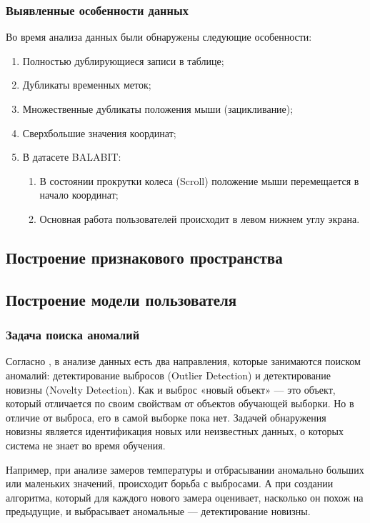 \documentclass[12pt]{article}
\begin{document}
    \subsubsection{Выявленные особенности данных}
    \label{sec:Research:Data:Features}
    
    Во время анализа данных были обнаружены следующие особенности:
    \begin{enumerate}
        \item Полностью дублирующиеся записи в таблице;
        \item Дубликаты временных меток;
        \item Множественные дубликаты положения мыши (зацикливание);
        \item Сверхбольшие значения координат;
        \item В датасете BALABIT:
        \begin{enumerate}
            \item В состоянии прокрутки колеса (Scroll) положение мыши перемещается в начало координат;
            \item Основная работа пользователей происходит в левом нижнем углу экрана.
        \end{enumerate}
    \end{enumerate}

    
    \subsection{Построение признакового пространства}
    \label{sec:Research:FeatureSpace}


    \subsection{Построение модели пользователя}
    \label{sec:Research:Model}
    
    \subsubsection{Задача поиска аномалий}
    \label{sec:Research:Model:Anomaly}

    \par Согласно \cite{Dyakonov, NoveltyDetection}, в анализе данных есть два направления, которые занимаются поиском аномалий: детектирование выбросов (Outlier Detection) и детектирование новизны (Novelty Detection). Как и выброс «новый объект» — это объект, который отличается по своим свойствам от объектов обучающей выборки. Но в отличие от выброса, его в самой выборке пока нет. Задачей обнаружения новизны является идентификация новых или неизвестных данных, о которых система не знает во время обучения. \\
    \par Например, при анализе замеров температуры и отбрасывании аномально больших или маленьких значений, происходит борьба с выбросами. А при создании алгоритма, который для каждого нового замера оценивает, насколько он похож на предыдущие, и выбрасывает аномальные — детектирование новизны.
\end{document}
